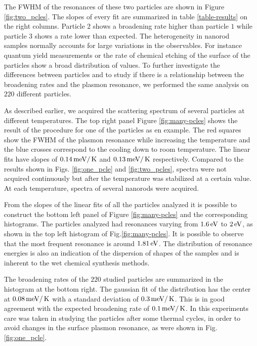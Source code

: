 The FWHM of the resonances of these two particles are shown in Figure
\ref{fig:two_pcles}. The slopes of every fit are summarized in table
\ref{table-results} on the right columns. Particle $2$ shows a broadening rate
higher than particle $1$ while particle $3$ shows a rate lower than expected.
The heterogeneity in nanorod samples normally accounts for large variations in
the observables. For instance quantum yield measurements\cite{Yorulmaz2012} or
the rate of chemical etching\cite{Carattino2016} of the surface of the particles
show a broad distribution of values. To further investigate the differences
between particles and to study if there is a relationship between the broadening
rates and the plasmon resonance, we performed the same analysis on $220$
different particles.

As described earlier, we acquired the scattering spectrum of several particles
at different temperatures. The top right panel Figure \ref{fig:many-pcles} shows
the result of the procedure for one of the particles as en example. The red
squares show the FWHM of the plasmon resonance while increasing the
temperature and the blue crosses correspond to the cooling down to room
temperature. The linear fits have slopes of $0.14\,\textrm{meV}/\,\textrm{K}$ and $0.13\,\textrm{meV}/\,\textrm{K}$
respectively. Compared to the results shown in Figs. \ref{fig:one_pcle} and
\ref{fig:two_pcles}, spectra were not acquired continuously but after the
temperature was stabilized at a certain value. At each temperature, spectra
of several nanorods were acquired.

From the slopes of the linear fits of all the particles analyzed it is possible
to construct the bottom left panel of Figure \ref{fig:many-pcles} and the
corresponding histograms. The particles analyzed had resonances varying from
$1.6\,\textrm{eV}$ to $2\,\textrm{eV}$, as shown in the top left histogram of
Fig.\ref{fig:many-pcles}. It is possible to observe that the most frequent
resonance is around $1.81\,\textrm{eV}$. The distribution of resonance energies is also an
indication of the dispersion of shapes of the samples and is inherent to the wet
chemical synthesis methods.

The broadening rates of the $220$ studied particles are summarized in the
histogram at the bottom right. The gaussian fit of the distribution has the
center at $0.08 \,\textrm{meV}/\,\textrm{K}$ with a standard deviation of $0.3 \,\textrm{meV}/\,\textrm{K}$. This is in
good agreement with the expected broadening rate of $0.1\,\textrm{meV}/\,\textrm{K}$. In this
experiments care was taken in studying the particles after some thermal cycles,
in order to avoid changes in the surface plasmon resonance, as were shown in
Fig. \ref{fig:one_pcle}. 

